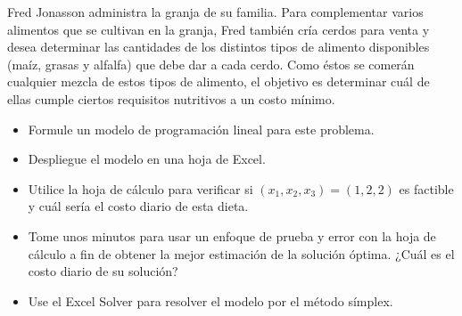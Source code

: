 \begin{Ejer} Fred Jonasson administra la granja de su familia. Para complementar varios alimentos que se cultivan en la granja, Fred tambi\'en cr\'ia cerdos para venta y desea determinar las cantidades de los distintos tipos de alimento disponibles (ma\'iz, grasas y alfalfa) que debe dar a cada cerdo. Como \'estos se comer\'an cualquier mezcla de estos tipos de alimento, el objetivo es determinar cu\'al de ellas cumple ciertos requisitos nutritivos a un costo m\'inimo.

\begin{center}
\end{center}

\begin{itemize}
\item[a)] Formule un modelo de programaci\'on lineal para este problema.
\item[b)] Despliegue el modelo en una hoja de Excel.
\item[c)] Utilice la hoja de c\'alculo para verificar si $(x_1,x_2,x_3)=(1,2,2)$ es factible y cu\'al ser\'ia el costo diario de esta dieta.
\item[d)] Tome unos minutos para usar un enfoque de prueba y error con la hoja de c\'alculo a fin de obtener la mejor estimaci\'on de la soluci\'on \'optima. ¿Cu\'al es el costo diario de su soluci\'on?
\item[e)] Use el Excel Solver para resolver el modelo por el m\'etodo s\'implex.
\end{itemize}


\end{Ejer}


